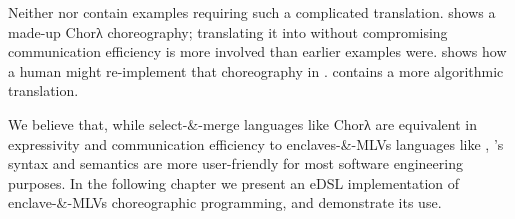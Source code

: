 Neither \cite{chor-lambda} nor \cite{chor-lambda-2} contain examples requiring such a complicated translation.
 shows a made-up Chorλ choreography;
translating it into \HLSCentral without compromising communication efficiency is more involved than earlier examples were.
 shows how a human might re-implement that choreography in \HLSCentral.
 contains a more algorithmic translation.

We believe that, while select-\&-merge languages like Chorλ are equivalent
in expressivity and communication efficiency to enclaves-\&-MLVs languages like \HLSCentral,
\HLSCentral's syntax and semantics are more user-friendly for most software engineering purposes.
In the following chapter we present an eDSL implementation of enclave-\&-MLVs choreographic programming,
and demonstrate its use.

